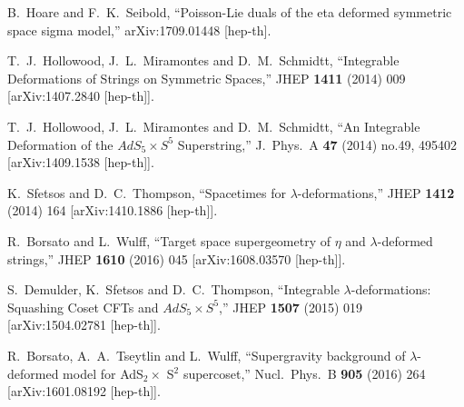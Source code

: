 \documentclass[12pt]{article}
\begin{document}
\begin{thebibliography}{99}
{  %
  B.~Hoare and F.~K.~Seibold,
   ``Poisson-Lie duals of the eta deformed symmetric space sigma model,''
  arXiv:1709.01448 [hep-th].
  
  T.~J.~Hollowood, J.~L.~Miramontes and D.~M.~Schmidtt,
  ``Integrable Deformations of Strings on Symmetric Spaces,''
  JHEP {\bf 1411} (2014) 009
  [arXiv:1407.2840 [hep-th]].
  
  T.~J.~Hollowood, J.~L.~Miramontes and D.~M.~Schmidtt,
  ``An Integrable Deformation of the $AdS_5 \times S^5$ Superstring,''
  J.\ Phys.\ A {\bf 47} (2014) no.49,  495402
  [arXiv:1409.1538 [hep-th]].
  
  
  K.~Sfetsos and D.~C.~Thompson,
  ``Spacetimes for $\lambda$-deformations,''
  JHEP {\bf 1412} (2014) 164
  [arXiv:1410.1886 [hep-th]].
  

  R.~Borsato and L.~Wulff,
  ``Target space supergeometry of $\eta$ and $\lambda$-deformed strings,''
  JHEP {\bf 1610} (2016) 045
  [arXiv:1608.03570 [hep-th]].
  
  S.~Demulder, K.~Sfetsos and D.~C.~Thompson,
  ``Integrable $\lambda$-deformations: Squashing Coset CFTs and $AdS_5\times S^5$,''
  JHEP {\bf 1507} (2015) 019
  [arXiv:1504.02781 [hep-th]].
  
  R.~Borsato, A.~A.~Tseytlin and L.~Wulff,
  ``Supergravity background of $\lambda$-deformed model for AdS$_2 \times$  S$^2$ supercoset,''
  Nucl.\ Phys.\ B {\bf 905} (2016) 264
  [arXiv:1601.08192 [hep-th]].
   
}
\end{thebibliography}
\end{document}
